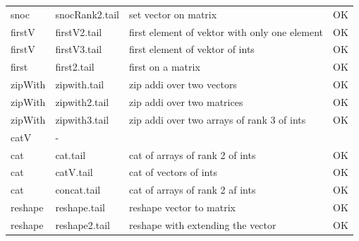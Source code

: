 \documentclass[11pt]{article}
\begin{document}
\begin{center}
\begin{tabular}{l l l l}
snoc			& snocRank2.tail	& set vector on matrix 					& OK \\
firstV			& firstV2.tail		& first element of vektor with only one element	& OK \\
firstV			& firstV3.tail 		& first element of vektor of ints				& OK \\
first			& first2.tail			& first on a matrix						& OK \\
zipWith		& zipwith.tail		& zip addi over two vectors					& OK \\ 
zipWith 		& zipwith2.tail		& zip addi over two matrices				& OK \\
zipWith 		& zipwith3.tail		& zip addi over two arrays of rank 3 of ints		& OK \\
catV			& - 				& 									& \\
cat			& cat.tail			& cat of arrays of rank 2 of ints				& OK \\
cat			& catV.tail			& cat of vectors of ints					& OK \\
cat			& concat.tail		& cat of arrays of rank 2 af ints				& OK \\
reshape		& reshape.tail		& reshape vector to matrix					&  OK \\
reshape		& reshape2.tail		& reshape with extending the vector			&  OK \\
\end{tabular}
\end{center}
\end{document}
